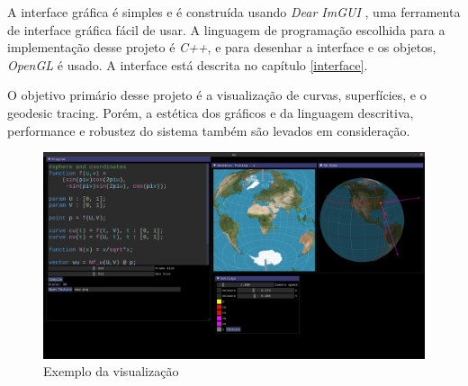 A interface gráfica é simples e é construída usando \textit{Dear ImGUI} \cite{ImGui},
uma ferramenta de interface gráfica fácil de usar.
A linguagem de programação escolhida para a implementação desse projeto é \textit{C++},
e para desenhar a interface e os objetos, \textit{OpenGL} é usado.
A interface está descrita no capítulo \ref{interface}.

O objetivo primário desse projeto é a visualização de curvas, superfícies, e o geodesic tracing.
Porém, a estética dos gráficos e da linguagem descritiva, performance
e robustez do sistema também são levados em consideração.

\begin{figure}[!ht]
    \includegraphics[width=\linewidth]{preview.png}
    \caption{Exemplo da visualização}
    \label{img:preview}
\end{figure}
